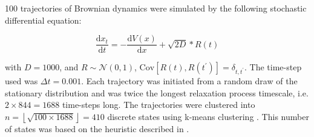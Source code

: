 100 trajectories of Brownian dynamics were simulated by the following stochastic differential equation: 

\begin{equation}\label{eqn:prinz_dynamics}
    \frac{\mathrm{d}x_t}{\mathrm{d}t} = -\frac{\mathrm{d}V(x)}{\mathrm{d}x} + \sqrt{2D} * R(t)
\end{equation}

with $D = 1000$, and $R\sim \mathcal{N}(0, 1)$, $\mathrm{Cov}\left[R(t), R(t^{\prime})\right]=\delta_{t, t^{\prime}}$. The time-step used was $\Delta t = 0.001$.  Each trajectory was initiated from a random draw of the stationary distribution and was twice the longest relaxation process timescale, i.e. $2\times 844=1688$ time-steps long. The trajectories were clustered into $n = \left\lfloor\sqrt{100\times 1688}\right\rfloor =410$ discrete states using k-means clustering \cite{friedman2001elements}. This number of states was based on the heuristic described in \cite{husicWardClusteringImproves2017a}.




